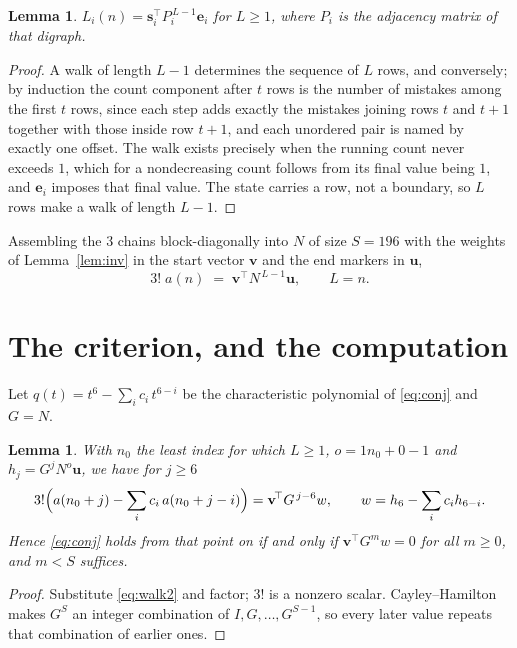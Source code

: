 \documentclass[11pt,a4paper]{article}
\theoremstyle{plain}
\newtheorem{lemma}[theorem]{Lemma}
\theoremstyle{definition}
\begin{document}
\begin{lemma}\label{lem:walk}
$L_i(n)=\mathbf{s}_i^{\!\top}P_i^{\,L-1}\mathbf{e}_i$ for $L\ge1$, where $P_i$ is the
adjacency matrix of that digraph.
\end{lemma}

\begin{proof}
A walk of length $L-1$ determines the sequence of $L$ rows, and conversely; by induction
the count component after $t$ rows is the number of mistakes among the first $t$ rows,
since each step adds exactly the mistakes joining rows $t$ and $t+1$ together with those
inside row $t+1$, and each unordered pair is named by exactly one offset. The walk exists
precisely when the running count never exceeds $1$, which for a nondecreasing count follows
from its final value being $1$, and $\mathbf{e}_i$ imposes that final value. The state
carries a row, not a boundary, so $L$ rows make a walk of length $L-1$.
\end{proof}

Assembling the $3$ chains block-diagonally into $N$ of size $S=196$ with the weights of
Lemma~\ref{lem:inv} in the start vector $\mathbf{v}$ and the end markers in
$\mathbf{u}$,
\begin{equation}\label{eq:walk2}
3!\;a(n)\;=\;\mathbf{v}^{\!\top}N^{\,L-1}\mathbf{u},\qquad L=n .
\end{equation}

\section{The criterion, and the computation}

Let $q(t)=t^{6}-\sum_i c_i\,t^{6-i}$ be the characteristic polynomial of
\eqref{eq:conj} and $G=N$.

\begin{lemma}\label{lem:crit}
With $n_0$ the least index for which $L\ge1$, $o=1n_0+0-1$ and
$h_j=G^{j}N^{o}\mathbf{u}$, we have for $j\ge6$
\[
3!\Bigl(a(n_0+j)-\sum_i c_i\,a(n_0+j-i)\Bigr)=\mathbf{v}^{\!\top}G^{\,j-6}w,
\qquad w=h_{6}-\sum_i c_ih_{6-i} .
\]
Hence \eqref{eq:conj} holds from that point on if and only if
$\mathbf{v}^{\!\top}G^{m}w=0$ for all $m\ge0$, and $m<S$ suffices.
\end{lemma}

\begin{proof}
Substitute \eqref{eq:walk2} and factor; $3!$ is a nonzero scalar. Cayley--Hamilton
makes $G^{S}$ an integer combination of $I,G,\dots,G^{S-1}$, so every later value repeats
that combination of earlier ones.
\end{proof}
\end{document}
